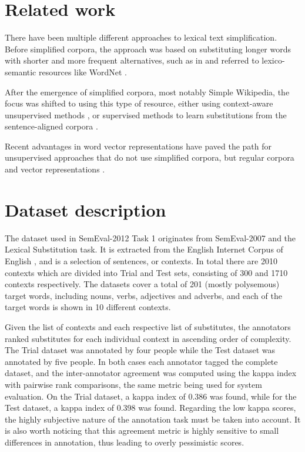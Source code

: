 \documentclass[10pt, a4paper]{article}
\begin{document}
\section{Related work}

There have been multiple different approaches to lexical text simplification. Before simplified corpora, the approach was based on substituting longer words with shorter and more frequent alternatives, such as in \citep{carroll1998practical,de2010text} and referred to lexico-semantic resources like WordNet \citep{fellbaum1998wordnet}.

After the emergence of simplified corpora, most notably Simple Wikipedia, the focus was shifted to using this type of resource, either using context-aware unsupervised methods \citep{biran2011putting}, or supervised methods to learn substitutions from the sentence-aligned corpora \citep{horn2014learning}.

Recent advantages in word vector representations \citep{pennington2014glove} have paved the path for unsupervised approaches that do not use simplified corpora, but regular corpora and vector representations \citep{glavavs2015simplifying}.

\section{Dataset description}

The dataset used in SemEval-2012 Task 1 originates from SemEval-2007 and the Lexical Substitution task. It is extracted from the English Internet Corpus of English \citep{sharoff2006creating}, and is a selection of sentences, or contexts. In total there are 2010 contexts which are divided into Trial and Test sets, consisting of 300 and 1710 contexts respectively. The datasets cover a total of 201 (mostly polysemous) target words, including nouns, verbs, adjectives and adverbs, and each of the target words is shown in 10 different contexts.

Given the list of contexts and each respective list of substitutes, the annotators ranked substitutes for each individual context in ascending order of complexity. The Trial dataset was annotated by four people while the Test dataset was annotated by five people. In both cases each annotator tagged the complete dataset, and the inter-annotator agreement was computed using the kappa index with pairwise rank comparisons, the same metric being used for system evaluation. On the Trial dataset, a kappa index of 0.386 was found, while for the Test dataset, a kappa index of 0.398 was found. Regarding the low kappa scores, the highly subjective nature of the annotation task must be taken into account. It is also worth noticing that this agreement metric is highly sensitive to small differences in annotation, thus leading to overly pessimistic scores.
\end{document}
